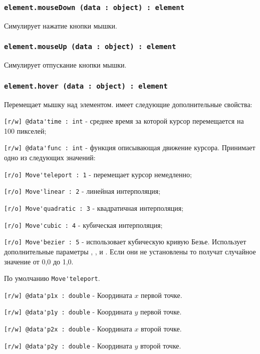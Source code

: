 \subsubsection{\lstinline|element.mouseDown (data : object) : element|}

Симулирует нажатие кнопки мышки.

\subsubsection{\lstinline|element.mouseUp (data : object) : element|}

Симулирует отпускание кнопки мышки.

\subsubsection{\lstinline|element.hover (data : object) : element|}

Перемещает мышку над элементом.  имеет следующие дополнительные свойства:
\begin{icItems}
	\item \lstinline|[r/w] @data'time : int| - среднее время за которой курсор перемещается на 100 пикселей;
	\item \lstinline|[r/w] @data'func : int| - функция описывающая движение курсора. Принимает одно из следующих значений:
	\begin{icItems}
		\item \lstinline|[r/o] Move'teleport : 1| - перемещает курсор немедленно;
		\item \lstinline|[r/o] Move'linear : 2| - линейная интерполяция;
		\item \lstinline|[r/o] Move'quadratic : 3| - квадратичная интерполяция;
		\item \lstinline|[r/o] Move'cubic : 4| - кубическая интерполяция;
		\item \lstinline|[r/o] Move'bezier : 5| - использовает кубическую кривую Безье. Использует дополнительные параметры , ,  и . Если они не установлены то получат случайное значение от 0,0 до 1,0.
	\end{icItems}
	По умолчанию \lstinline|Move'teleport|.
	\item \lstinline|[r/w] @data'p1x : double| - Координата $x$ первой точке.
	\item \lstinline|[r/w] @data'p1y : double| - Координата $y$ первой точке.
	\item \lstinline|[r/w] @data'p2x : double| - Координата $x$ второй точке.
	\item \lstinline|[r/w] @data'p2y : double| - Координата $y$ второй точке.
\end{icItems}

